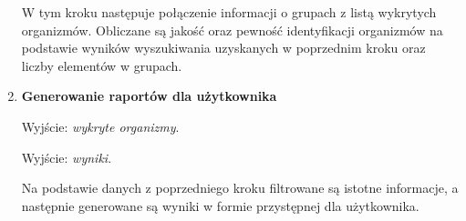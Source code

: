 \begin{enumerate}
{                    W tym kroku następuje połączenie informacji o grupach z listą wykrytych organizmów. Obliczane są jakość oraz pewność identyfikacji organizmów na podstawie wyników wyszukiwania uzyskanych w poprzednim kroku oraz liczby elementów w grupach.
                }
                \item {
                    \textbf{Generowanie raportów dla użytkownika}

                    Wyjście: \textit{wykryte organizmy}.

                    Wyjście: \textit{wyniki}.

                    Na podstawie danych z poprzedniego kroku filtrowane są istotne informacje, a następnie generowane są wyniki w formie przystępnej dla użytkownika.
                }
            \end{enumerate}


